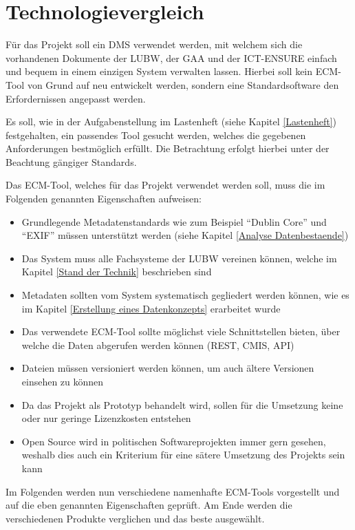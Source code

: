 \section{Technologievergleich}\label{Technologievergleich}
F\"ur das Projekt soll ein \ac{DMS} verwendet werden, mit welchem sich die vorhandenen Dokumente der \ac{LUBW}, der \ac{GAA} und der \ac{ICT-ENSURE} einfach und bequem in einem einzigen System verwalten lassen. Hierbei soll kein \ac{ECM}-Tool von Grund auf neu entwickelt werden, sondern eine Standardsoftware den Erfordernissen angepasst werden. 

Es soll, wie in der Aufgabenstellung im Lastenheft (siehe Kapitel \ref{Lastenheft}) festgehalten, ein passendes Tool gesucht werden, welches die gegebenen Anforderungen bestm\"oglich erf\"ullt. Die Betrachtung erfolgt hierbei unter der Beachtung g\"angiger Standards.

Das \ac{ECM}-Tool, welches f\"ur das Projekt verwendet werden soll, muss die im Folgenden genannten Eigenschaften aufweisen:

\begin{itemize}
 \item Grundlegende Metadatenstandards wie zum Beispiel "`Dublin Core"' und "`EXIF"' m\"ussen unterst\"utzt werden (siehe Kapitel \ref{Analyse Datenbestaende})
 \item Das System muss alle Fachsysteme der \ac{LUBW} vereinen k\"onnen, welche im Kapitel \ref{Stand der Technik} beschrieben sind
 \item Metadaten sollten vom System systematisch gegliedert werden k\"onnen, wie es im Kapitel \ref{Erstellung eines Datenkonzepts} erarbeitet wurde
 \item Das verwendete \ac{ECM}-Tool sollte m\"oglichst viele Schnittstellen bieten, \"uber welche die Daten abgerufen werden k\"onnen (\ac{REST}, \ac{CMIS}, \ac{API})
 \item Dateien m\"ussen versioniert werden k\"onnen, um auch \"altere Versionen einsehen zu k\"onnen
 \item Da das Projekt als Prototyp behandelt wird, sollen f\"ur die Umsetzung keine oder nur geringe Lizenzkosten entstehen
 \item Open Source wird in politischen Softwareprojekten immer gern gesehen, weshalb dies auch ein Kriterium f\"ur eine s\"atere Umsetzung des Projekts sein kann
\end{itemize}

Im Folgenden werden nun verschiedene namenhafte \ac{ECM}-Tools vorgestellt und auf die eben genannten Eigenschaften gepr\"uft. Am Ende werden die verschiedenen Produkte verglichen und das beste ausgew\"ahlt.


